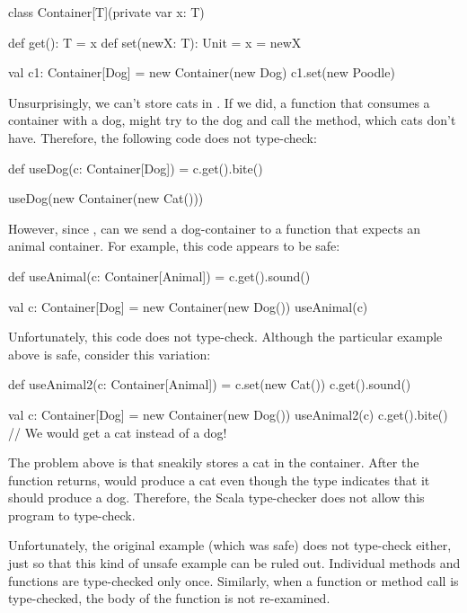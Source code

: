 \documentclass{book}
\begin{document}
\begin{scalacode}
class Container[T](private var x: T) {

  def get(): T = x
  def set(newX: T): Unit = x = newX

}

val c1: Container[Dog] = new Container(new Dog)
c1.set(new Poodle)
\end{scalacode}

Unsurprisingly, we can't store cats in . If we did, a function
that consumes a container with a dog, might try to  the
dog and call the  method, which cats don't have.
Therefore, the following code does not type-check:

\begin{scalacode}
def useDog(c: Container[Dog]) = {
  c.get().bite()
}

useDog(new Container(new Cat()))
\end{scalacode}

However, since , can we send a dog-container
to a function that expects an animal container. For example, this code
appears to be safe:

\begin{scalacode}
def useAnimal(c: Container[Animal]) = {
  c.get().sound()
}

val c: Container[Dog] = new Container(new Dog())
useAnimal(c)
\end{scalacode}

Unfortunately, this code does not type-check. Although the particular example
above is safe, consider this variation:
\begin{scalacode}
def useAnimal2(c: Container[Animal]) = {
  c.set(new Cat())
  c.get().sound()
}

val c: Container[Dog] = new Container(new Dog())
useAnimal2(c)
c.get().bite() // We would get a cat instead of a dog!
\end{scalacode}

The problem above is that  sneakily stores a cat in
the container. After the function returns,  would produce
a cat even though the type indicates that it should produce a dog.
Therefore, the Scala type-checker does not allow this program to type-check.

Unfortunately, the original example (which was safe) does not type-check either, just so that
this kind of unsafe example can be ruled out. Individual methods and functions
are type-checked only once. Similarly, when a function or method call is type-checked,
the body of the function is not re-examined.
\end{document}
